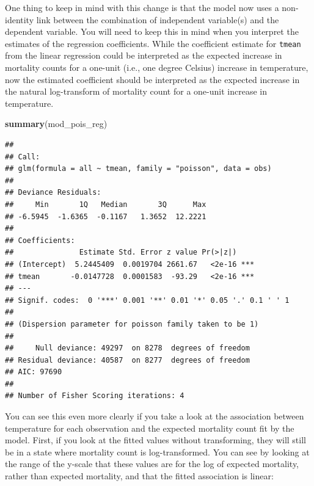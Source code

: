 \documentclass[
]{book}
\newenvironment{Shaded}{\begin{snugshade}}{\end{snugshade}}
\newcommand{\KeywordTok}[1]{\textcolor[rgb]{0.13,0.29,0.53}{\textbf{#1}}}
\newcommand{\NormalTok}[1]{#1}
\begin{document}
One thing to keep in mind with this change is that the model now uses a
non-identity link between the combination of independent variable(s) and the
dependent variable. You will need to keep this in mind when you interpret
the estimates of the regression coefficients. While the coefficient estimate
for \texttt{tmean} from the linear regression could be interpreted as the expected
increase in mortality counts for a one-unit (i.e., one degree Celsius) increase
in temperature, now the estimated coefficient should be interpreted as the
expected increase in the natural log-transform of mortality count for a one-unit
increase in temperature.

\begin{Shaded}
\begin{Highlighting}[]
\KeywordTok{summary}\NormalTok{(mod_pois_reg)}
\end{Highlighting}
\end{Shaded}

\begin{verbatim}
## 
## Call:
## glm(formula = all ~ tmean, family = "poisson", data = obs)
## 
## Deviance Residuals: 
##     Min       1Q   Median       3Q      Max  
## -6.5945  -1.6365  -0.1167   1.3652  12.2221  
## 
## Coefficients:
##               Estimate Std. Error z value Pr(>|z|)    
## (Intercept)  5.2445409  0.0019704 2661.67   <2e-16 ***
## tmean       -0.0147728  0.0001583  -93.29   <2e-16 ***
## ---
## Signif. codes:  0 '***' 0.001 '**' 0.01 '*' 0.05 '.' 0.1 ' ' 1
## 
## (Dispersion parameter for poisson family taken to be 1)
## 
##     Null deviance: 49297  on 8278  degrees of freedom
## Residual deviance: 40587  on 8277  degrees of freedom
## AIC: 97690
## 
## Number of Fisher Scoring iterations: 4
\end{verbatim}

You can see this even more clearly if you take a look at the association between
temperature for each observation and the expected mortality count fit by the
model. First, if you look at the fitted values without transforming, they
will still be in a state where mortality count is log-transformed. You can
see by looking at the range of the y-scale that these values are for the log
of expected mortality, rather than expected mortality, and that the fitted
association is linear:
\end{document}
